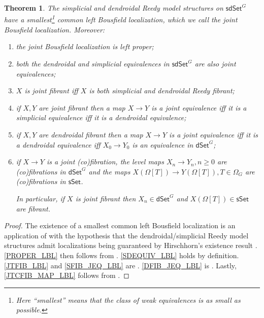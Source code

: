 \documentclass[a4paper,10pt]{article}%
\numberwithin{equation}{section}
\numberwithin{figure}{section}
\newtheorem{theorem}[equation]{Theorem}%
\theoremstyle{definition} %
\newcommand{\sSet}{\ensuremath{\mathsf{sSet}}}%
\newcommand{\dSet}{\mathsf{dSet}}
\newcommand{\1}{\ensuremath{\mathbbm 1}}%
\begin{document}
\begin{theorem}\label{JB_THM}
	The simplicial and dendroidal Reedy model structures on 
	$\mathsf{sdSet}^G$
	have a smallest\footnote{Here ``smallest'' means that the class of weak equivalences is as small as possible.}
	common left Bousfield localization,
	which we call the \emph{joint Bousfield localization}.
	Moreover:
\begin{enumerate}[label = (\roman*)]
	\item \label{PROPER_LBL}
	the joint Bousfield localization is left proper;
	\item \label{SDEQUIV_LBL}
	both the dendroidal and simplicial equivalences in $\mathsf{sdSet}^G$ are also joint equivalences;
	\item \label{JTFIB_LBL}
	$X$ is joint fibrant iff $X$ is both simplicial and dendroidal Reedy fibrant;
	\item \label{SFIB_JEQ_LBL} if $X,Y$ are joint fibrant
	then a map $X \to Y$ is a joint equivalence iff it is a simplicial
	equivalence iff it is a dendroidal equivalence;
	\item \label{DFIB_JEQ_LBL} if $X,Y$ are dendroidal fibrant
	then a map $X \to Y$ is a joint equivalence iff 
	it is a dendroidal equivalence iff $X_0 \to Y_0$ is an equivalence in $\mathsf{dSet}^G$;
	\item \label{JTCFIB_MAP_LBL} 
	if $X \to Y$ is a joint (co)fibration,
	the level maps 
	$X_n \to Y_n, n \geq 0$
	are (co)fibrations in $\mathsf{dSet}^G$
	and the maps
	$X\left(\Omega[T]\right) \to Y\left(\Omega[T]\right), T \in \Omega_G$
	are (co)fibrations in $\mathsf{sSet}$.

	In particular, if 
	$X$ is joint fibrant
	then $X_n \in \dSet^G$ and $X(\Omega[T]) \in \sSet$ are fibrant.
\end{enumerate}
\end{theorem}



\begin{proof}
	The existence of a smallest common left Bousfield localization is 
	an application of \cite[Prop. 4.1]{BP_edss}
	with the hypothesis that the dendroidal/simplicial Reedy model structures admit localizations being guaranteed by 
	Hirschhorn's existence result 
	\cite[Thm. 4.1.1]{Hir03}.
	\ref{PROPER_LBL} then follows from \cite[Thm. 4.1.1(3)]{Hir03}.
	\ref{SDEQUIV_LBL} holds by definition.
	\ref{JTFIB_LBL} and \ref{SFIB_JEQ_LBL} are \cite[Prop. 4.1(i)(ii)]{BP_edss}.
	\ref{DFIB_JEQ_LBL} is \cite[Cor. 4.29(iii)]{BP_edss}.
	Lastly, \ref{JTCFIB_MAP_LBL} follows from \cite[Lemmas A.27(i), A.29(i)]{BP_edss}.
\end{proof}
\end{document}
